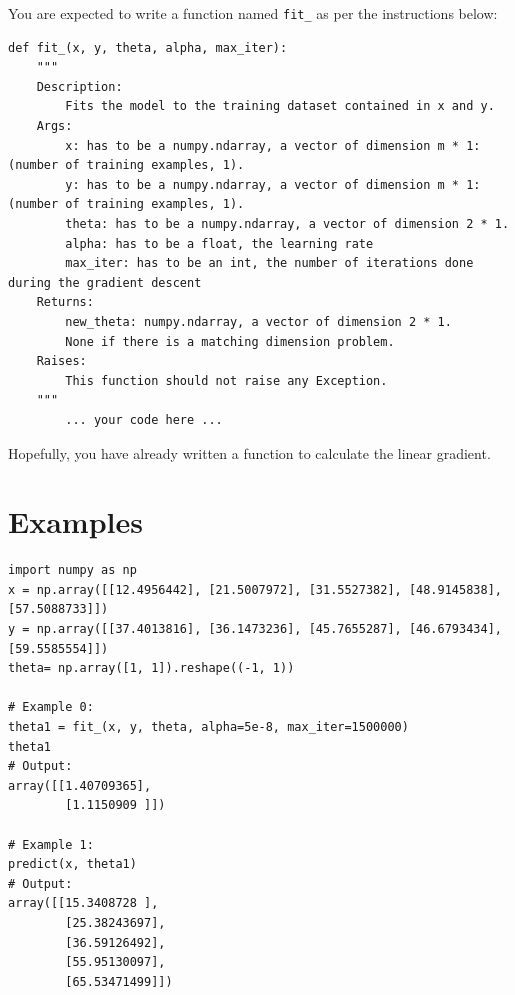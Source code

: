 \documentclass{42-en}
\begin{document}
You are expected to write a function named \texttt{fit\_} as per the instructions below:

\begin{verbatim}
def fit_(x, y, theta, alpha, max_iter):
	"""
	Description:
		Fits the model to the training dataset contained in x and y.
	Args:
		x: has to be a numpy.ndarray, a vector of dimension m * 1: (number of training examples, 1).
		y: has to be a numpy.ndarray, a vector of dimension m * 1: (number of training examples, 1).
		theta: has to be a numpy.ndarray, a vector of dimension 2 * 1.
		alpha: has to be a float, the learning rate
		max_iter: has to be an int, the number of iterations done during the gradient descent
	Returns:
		new_theta: numpy.ndarray, a vector of dimension 2 * 1.
		None if there is a matching dimension problem.
	Raises:
		This function should not raise any Exception.
	"""
		... your code here ...
\end{verbatim}

Hopefully, you have already written a function to calculate the linear gradient.


\section*{Examples}
\begin{verbatim}
import numpy as np
x = np.array([[12.4956442], [21.5007972], [31.5527382], [48.9145838], [57.5088733]])
y = np.array([[37.4013816], [36.1473236], [45.7655287], [46.6793434], [59.5585554]])
theta= np.array([1, 1]).reshape((-1, 1))

# Example 0:
theta1 = fit_(x, y, theta, alpha=5e-8, max_iter=1500000)
theta1
# Output:
array([[1.40709365],
		[1.1150909 ]])

# Example 1:
predict(x, theta1)
# Output:
array([[15.3408728 ],
		[25.38243697],
		[36.59126492],
		[55.95130097],
		[65.53471499]])
\end{verbatim}

\end{document}
